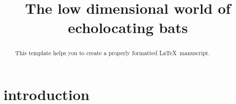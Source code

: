\documentclass[preprint,5p]{elsarticle}
\begin{document}
\newcommand{\pca}{xx}
\newcommand{\nneurons}{xx}
\newcommand{\nweights}{37 thousand}

\newcommand{\noise}{\mathcal{N}}
\newcommand{\noisefloor}{\mathcal{N}_f}
\newcommand{\stochasticnoise}{\mathcal{N}_s}
\newcommand{\db}{dB}


\newcommand{\PCA}{\gls{PCA}} 

\newcommand{\pc}{\gls{pc}} 
\newcommand{\pcs}{\glspl{pc}} 



\begin{frontmatter}

\title{The low dimensional world of echolocating bats}






\begin{abstract}
This template helps you to create a properly formatted \LaTeX\ manuscript.
\end{abstract}


\end{frontmatter}


\section{introduction}
\end{document}
